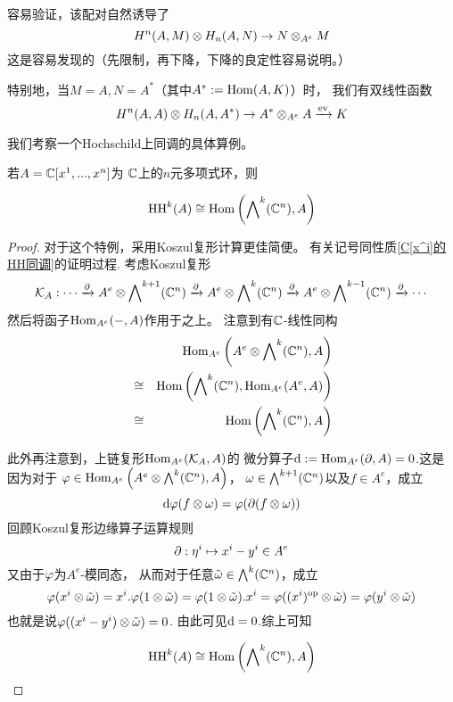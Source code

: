 容易验证，该配对自然诱导了
$$H^n(A,M)\otimes H_n(A,N)\to N\otimes_{A^e}M$$
这是容易发现的（先限制，再下降，下降的良定性容易说明。）

特别地，当$M=A,N=A^*$（其中$A^*:=\operatorname{Hom}(A,K)$）时，
我们有双线性函数
$$H^n(A,A)\otimes H_n(A,A^*)\to A^*\otimes_{A^e}A\xrightarrow{\operatorname{ev}}K$$


\vs

我们考察一个Hochschild上同调的具体算例。

\begin{prop}若$A=\mathbb{C}[x^1,...,x^n]$为
$\mathbb{C}$上的$n$元多项式环，则

$$\operatorname{HH}^k(A)\cong
\operatorname{Hom}\left(\bigwedge\nolimits^{k}(\mathbb{C}^n),A\right)$$
\end{prop}

\begin{proof}
对于这个特例，采用Koszul复形计算更佳简便。
有关记号同性质\ref{C[x^i]的HH同调}的证明过程.
考虑Koszul复形
$$
\mathcal{K}_A:\cdots
\xrightarrow{\partial}A^e\otimes\bigwedge\nolimits^{k+1}(\mathbb{C}^n)
\xrightarrow{\partial}A^e\otimes\bigwedge\nolimits^{k}(\mathbb{C}^n)
\xrightarrow{\partial}A^e\otimes\bigwedge\nolimits^{k-1}(\mathbb{C}^n)
\xrightarrow{\partial}\cdots
$$
然后将函子$\operatorname{Hom}_{A^e}(-,A)$作用于之上。
注意到有$\mathbb{C}$-线性同构
\begin{eqnarray*}
&&      \operatorname{Hom}_{A^e}\left(A^e\otimes\bigwedge\nolimits^{k}(\mathbb{C}^n),A\right)\\
&\cong& \operatorname{Hom}\left(\bigwedge\nolimits^{k}(\mathbb{C}^n),\operatorname{Hom}_{A^e}(A^e,A)\right)\\
&\cong& \operatorname{Hom}\left(\bigwedge\nolimits^{k}(\mathbb{C}^n),A\right)
\end{eqnarray*}

此外再注意到，上链复形$\operatorname{Hom}_{A^e}(\mathcal{K}_A,A)$的
微分算子$\mathrm{d}:=\operatorname{Hom}_{A^e}(\partial,A)=0$.这是因为对于
$\varphi\in\operatorname{Hom}_{A^e}\left(A^e\otimes\bigwedge\nolimits^{k}(\mathbb{C}^n),A\right)$，
$\omega\in\bigwedge\nolimits^{k+1}(\mathbb{C}^n)$以及$f\in A^e$，成立
$$\mathrm{d}\varphi(f\otimes\omega)=\varphi(\partial(f\otimes\omega))$$
回顾Koszul复形边缘算子运算规则
$$\partial:\eta^i\mapsto x^i-y^i\in A^e$$
又由于$\varphi$为$A^e$-模同态，
从而对于任意$\tilde{\omega}\in\bigwedge\nolimits^{k}(\mathbb{C}^n)$，成立
$$
\varphi(x^i\otimes\tilde{\omega})
=x^i.\varphi(1\otimes\tilde{\omega})
=\varphi(1\otimes\tilde{\omega}).x^i
=\varphi((x^i)^{\text{op}}\otimes\tilde{\omega})
=\varphi(y^i\otimes\tilde{\omega})$$
也就是说$\varphi((x^i-y^i)\otimes\tilde{\omega})=0$.
由此可见$\mathrm{d}=0$.综上可知

$$\operatorname{HH}^k(A)\cong
\operatorname{Hom}\left(\bigwedge\nolimits^{k}(\mathbb{C}^n),A\right)$$

\end{proof}

